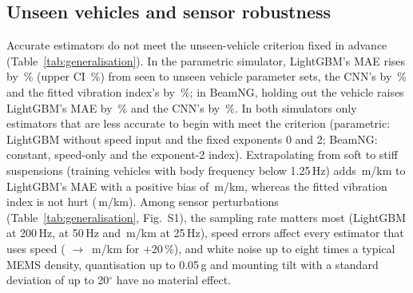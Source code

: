 \subsection{Unseen vehicles and sensor robustness}
\label{sec:res_controlled}
Accurate estimators do not meet the unseen-vehicle criterion fixed in advance (Table~\ref{tab:generalisation}).
In the parametric simulator, LightGBM's MAE rises by \uvGbmRelAbs\,\% (upper CI \uvGbmRelHiAbs\,\%) from seen to unseen vehicle parameter sets, the CNN's by \uvCnnRelAbs\,\% and the fitted vibration index's by \uvPhysRelAbs\,\%; in BeamNG, holding out the vehicle raises LightGBM's MAE by \bngVehGbmRelAbs\,\% and the CNN's by \bngVehCnnRelAbs\,\%.
In both simulators only estimators that are less accurate to begin with meet the criterion (parametric: LightGBM without speed input and the fixed exponents 0 and 2; BeamNG: constant, speed-only and the exponent-2 index).
Extrapolating from soft to stiff suspensions (training vehicles with body frequency below 1.25\,Hz) adds \rgGbmDiff\,m/km to LightGBM's MAE with a positive bias of \rgGbmBias\,m/km, whereas the fitted vibration index is not hurt (\rgPhysDiff\,m/km).
Among sensor perturbations (Table~\ref{tab:generalisation}, Fig.~S1), the sampling rate matters most (LightGBM \rbGbmRateTwoHundred{} at 200\,Hz, \rbGbmRateFifty{} at 50\,Hz and \rbGbmRateTwentyFive\,m/km at 25\,Hz), speed errors affect every estimator that uses speed (\rbGbmSpeedZero{} $\rightarrow$ \rbGbmSpeedPlusTwenty\,m/km for $+$20\,\%), and white noise up to eight times a typical MEMS density, quantisation up to 0.05\,g and mounting tilt with a standard deviation of up to 20$^{\circ}$ have no material effect.

